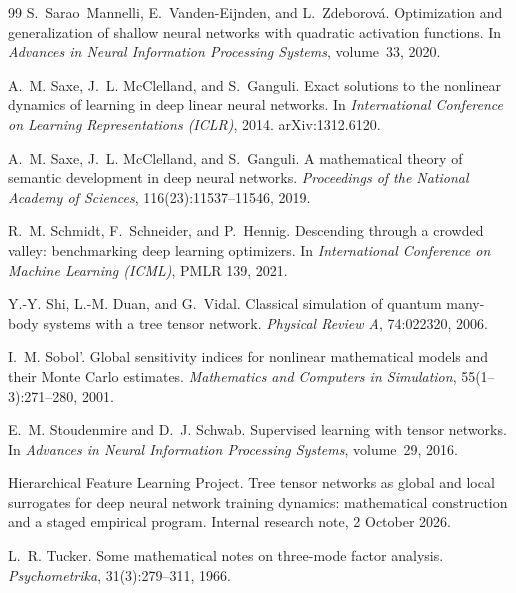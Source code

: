 \documentclass[11pt]{article}
\theoremstyle{definition}
\numberwithin{equation}{section}
\begin{document}
\begin{thebibliography}{99}
S.~Sarao~Mannelli, E.~Vanden-Eijnden, and L.~Zdeborov\'a.
\newblock Optimization and generalization of shallow neural networks with quadratic activation functions.
\newblock In \emph{Advances in Neural Information Processing Systems}, volume~33, 2020.

A.~M. Saxe, J.~L. McClelland, and S.~Ganguli.
\newblock Exact solutions to the nonlinear dynamics of learning in deep linear neural networks.
\newblock In \emph{International Conference on Learning Representations (ICLR)}, 2014. arXiv:1312.6120.

A.~M. Saxe, J.~L. McClelland, and S.~Ganguli.
\newblock A mathematical theory of semantic development in deep neural networks.
\newblock \emph{Proceedings of the National Academy of Sciences}, 116(23):11537--11546, 2019.

R.~M. Schmidt, F.~Schneider, and P.~Hennig.
\newblock Descending through a crowded valley: benchmarking deep learning optimizers.
\newblock In \emph{International Conference on Machine Learning (ICML)}, PMLR 139, 2021.

Y.-Y. Shi, L.-M. Duan, and G.~Vidal.
\newblock Classical simulation of quantum many-body systems with a tree tensor network.
\newblock \emph{Physical Review A}, 74:022320, 2006.

I.~M. Sobol'.
\newblock Global sensitivity indices for nonlinear mathematical models and their {M}onte {C}arlo estimates.
\newblock \emph{Mathematics and Computers in Simulation}, 55(1--3):271--280, 2001.

E.~M. Stoudenmire and D.~J. Schwab.
\newblock Supervised learning with tensor networks.
\newblock In \emph{Advances in Neural Information Processing Systems}, volume~29, 2016.

Hierarchical Feature Learning Project.
\newblock Tree tensor networks as global and local surrogates for deep neural network training dynamics: mathematical construction and a staged empirical program.
\newblock Internal research note, 2 October 2026.

L.~R. Tucker.
\newblock Some mathematical notes on three-mode factor analysis.
\newblock \emph{Psychometrika}, 31(3):279--311, 1966.


\end{thebibliography}
\end{document}

